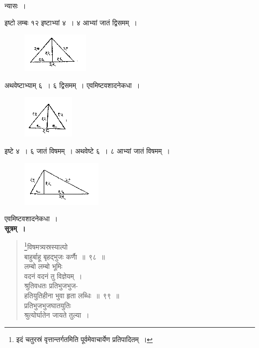 \documentclass[11pt, openany]{book}
\begin{document}
 न्यासः~। \\
\vspace{-4mm}

 इष्टो लम्बः १२ इष्टाभ्यां ४~। ४ आभ्यां जातं द्विसमम्~। 
\vspace{-2mm}

\begin{figure}[h!]
    \centering
    \includegraphics[scale=0.85]{graphics/capture116.png}
\end{figure}

\newpage%

 अथवेष्टाभ्याम् ६~। ६ द्विसमम्~। एवमिष्टवशादनेकधा~।
\vspace{-2mm}

\begin{figure}[h!]
    \centering
    \includegraphics[scale=0.85]{graphics/capture117.png}
\end{figure}
\vspace{-2mm}

 इष्टे ४~। ६ जातं विषमम्~। अथवेष्टे ६~। ८ आभ्यां जातं विषमम्~।
\vspace{-2mm}

\begin{figure}[h!]
    \centering
    \includegraphics[scale=0.85]{graphics/capture118.png}
\end{figure}
\vspace{-2mm}

 एवमिष्टवशादनेकधा~। \\

 \textbf{सूत्रम्~।} 
 \label{4.100}
\begin{quote}
    \bs 
     \footnote{इदं चतुरस्रं वृत्तान्तर्गतमिति पूर्वमेवाचार्येण प्रतिपादितम्~।}विषमत्र्यस्रस्याल्पो \\
     बाहुर्बाहू बृहद्भुजः कर्णाै~॥~९८~॥ \\
लम्बो लम्बो भूमिः \\
वदनं वदनं तु विज्ञेयम्~।\\
श्रुतिवधतः प्रतिभुजभुज-\\
हतियुतिहीना भुवा हृता लब्धिः~॥~९९~॥ \\
प्रतिभुजभुजघातयुतिः \\
श्रुत्योर्घातेन जायते तुल्या~।
\end{quote}
\end{document}
